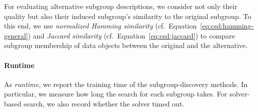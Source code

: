 \documentclass{article}
\theoremstyle{definition}
\begin{document}
For evaluating alternative subgroup descriptions, we consider not only their quality but also their induced subgroup's similarity to the original subgroup.
To this end, we use \emph{normalized Hamming similarity} (cf.~Equation~\ref{eq:csd:hamming-general}) and \emph{Jaccard similarity} (cf.~Equation~\ref{eq:csd:jaccard}) to compare subgroup membership of data objects between the original and the alternative.

\paragraph{Runtime}

As \emph{runtime}, we report the training time of the subgroup-discovery methods.
In particular, we measure how long the search for each subgroup takes.
For solver-based search, we also record whether the solver timed out.
\end{document}
